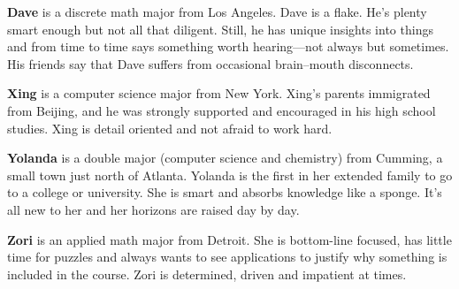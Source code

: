 \medskip
\noindent
\textbf{Dave} is a discrete math major from Los Angeles. Dave is a flake.  
He's plenty smart enough but not all that diligent.  Still, he has unique 
insights into things and from time to time says something worth 
hearing---not always but sometimes.  His friends say that Dave suffers
from occasional brain--mouth disconnects.

\medskip
\noindent
\textbf{Xing} is a computer science major from New York.  Xing's parents 
immigrated from Beijing, and he was strongly supported and encouraged in 
his high school studies. Xing is detail oriented and not afraid to work
hard.

\medskip
\noindent
\textbf{Yolanda} is a double major (computer science and chemistry) from
Cumming, a small town just north of Atlanta.  Yolanda is the first in her
extended family to go to a college or university.  She is smart
and absorbs knowledge like a sponge.  It's all new to her and her
horizons are raised day by day.

\medskip
\noindent
\textbf{Zori} is an applied math major from Detroit.  She is bottom-line
focused, has little time for puzzles and always wants to see applications
to justify why something is included in the course.  Zori is determined, 
driven and impatient at times.


